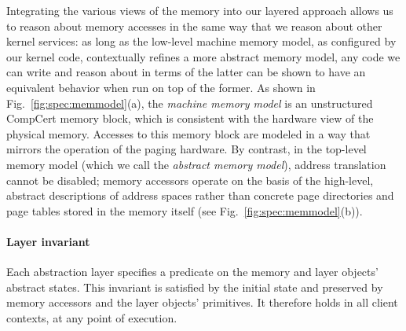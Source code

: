 Integrating the various views of the memory into our layered approach
allows us to reason about memory accesses in the same way that
we reason about other kernel services:
as long as the low-level machine memory model,
as configured by our kernel code,
contextually refines a more abstract memory model,
any code we can write and reason about in terms of the latter
can be shown to have an equivalent behavior
when run on top of the former.
As shown in Fig.~\ref{fig:spec:memmodel}(a),
the \emph{machine memory model} is an unstructured CompCert memory block,
which is consistent with the hardware view of the physical memory.
Accesses to this memory block are
modeled in a way that mirrors the operation of the paging hardware.
By contrast,
in the top-level memory model (which we call the \emph{abstract memory model}),
address translation cannot be disabled; memory accessors operate on the basis of
the high-level, abstract descriptions of address spaces
rather than concrete page directories and page tables stored in the memory
itself (see Fig.~\ref{fig:spec:memmodel}(b)).


\paragraph{Layer invariant}
Each abstraction layer specifies a predicate
on the memory and layer objects' abstract states.
This invariant is satisfied by the initial state and
preserved by memory accessors and the layer objects' primitives.
It therefore holds in all client contexts,
at any point of execution.

